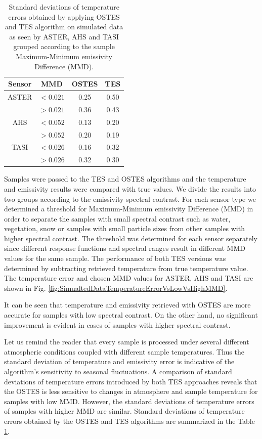 \begin{table}[thb]
\vspace{0.5em}
\footnotesize
\centering
\begin{tabular}{cccc}
\toprule
Sensor & MMD & OSTES & TES \\ \hline
ASTER 	& $< 0.021$ & 0.25 & 0.50 \\
 		& $> 0.021$ & 0.36 & 0.43 \\ \hline
AHS 		& $< 0.052$ & 0.13 & 0.20 \\
 		& $> 0.052$ & 0.20 & 0.19 \\ \hline
TASI 	& $< 0.026$ & 0.16 & 0.32 \\
 		& $> 0.026$ & 0.32 & 0.30 \\
\bottomrule
\end{tabular}
\vspace{1.5 em}
\caption{Standard deviations of temperature errors obtained by applying OSTES and TES algorithm on simulated data as seen by ASTER, AHS and TASI grouped according to the sample Maximum-Minimum emissivity Difference (MMD). }
\label{table:StandardDeviations}
\normalsize
\end{table}

Samples were passed to the TES and OSTES algorithms and the temperature and emissivity results were compared with true values. We divide the results into two groups according to the emissivity spectral contrast. For each sensor type we determined a threshold for Maximum-Minimum emissivity Difference (MMD) in order to separate the samples with small spectral contrast such as water, vegetation, snow or samples with small particle sizes from other samples with higher spectral contrast. The threshold was determined for each sensor separately since different response functions and spectral ranges result in different MMD values for the same sample. The performance of both TES versions was determined by subtracting retrieved temperature from true temperature value. The temperature error and chosen MMD values for ASTER, AHS and TASI are shown in Fig. \ref{fig:SimualtedDataTemperatureErrorVsLowVsHighMMD}.

It can be seen that temperature and emissivity retrieved with OSTES are more accurate for samples with low spectral contrast. On the other hand, no significant improvement is evident in cases of samples with higher spectral contrast. 

Let us remind the reader that every sample is processed under several different atmospheric conditions coupled with different sample temperatures. Thus the standard deviation of temperature and emissivity error is indicative of the algorithm’s sensitivity to seasonal fluctuations. A comparison of standard deviations of temperature errors introduced by both TES approaches reveals that the OSTES is less sensitive to changes in atmosphere and sample temperature for samples with low MMD. However, the standard deviations of temperature errors of samples with higher MMD are similar. Standard deviations of temperature errors obtained by the OSTES and TES algorithms are summarized in the Table \ref{table:StandardDeviations}.

